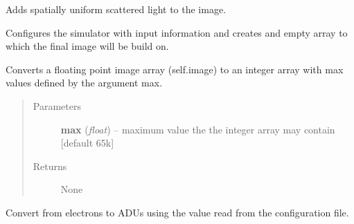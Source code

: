\documentclass[a4paper,11pt,english]{sphinxmanual}
\begin{document}
\begin{fulllineitems}
\begin{fulllineitems}
\end{fulllineitems}


\begin{fulllineitems}
\label{simulator:simulator.simulator.VISsimulator.applyScatteredLight}
Adds spatially uniform scattered light to the image.

\end{fulllineitems}


\begin{fulllineitems}
\label{simulator:simulator.simulator.VISsimulator.configure}
Configures the simulator with input information and creates and empty array to which the final image will
be build on.

\end{fulllineitems}


\begin{fulllineitems}
\label{simulator:simulator.simulator.VISsimulator.discretise}
Converts a floating point image array (self.image) to an integer array with max values
defined by the argument max.
\begin{quote}\begin{description}
\item[{Parameters}] \leavevmode
\textbf{max} (\emph{float}) -- maximum value the the integer array may contain {[}default 65k{]}

\item[{Returns}] \leavevmode
None

\end{description}\end{quote}

\end{fulllineitems}


\begin{fulllineitems}
\label{simulator:simulator.simulator.VISsimulator.electrons2ADU}
Convert from electrons to ADUs using the value read from the configuration file.


\end{fulllineitems}
\end{fulllineitems}
\end{document}
